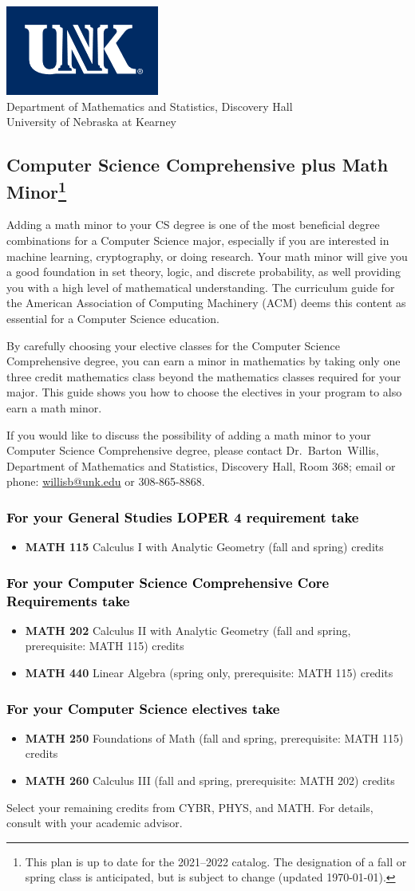\documentclass[10pt]{article}
\makeatletter
\newenvironment{mypar}[2]
   {\begin{list}{}%
     {\setlength\leftmargin{#1}
     \setlength\rightmargin{#2}}
     \item[]}
   {\end{list}}
\newcommand{\calcone}{\textbf{MATH 115} Calculus I with Analytic Geometry (fall and spring) \dotfill 5 credits}
\newcommand{\calctwo}{\textbf{MATH 202} Calculus II with Analytic Geometry (fall and spring, prerequisite: MATH 115) \dotfill 5 credits }
\newcommand{\foundations}{\textbf{MATH 250} Foundations of Math (fall and spring, prerequisite: MATH 115)  \dotfill 3 credits}
\newcommand{\calcthree}{\textbf{MATH 260} Calculus III  (fall and spring, prerequisite: MATH 202) \dotfill 5 credits}
\newcommand{\linear}{\textbf{MATH 440} Linear Algebra (spring only, prerequisite: MATH 115) \dotfill 3 credits}
\newcommand{\contactbw}{\mbox{Dr.\ Barton Willis}, Department of Mathematics and Statistics,  Discovery Hall, Room 368;
email or phone: \href{mailto:willisb@unk.edu}{willisb@unk.edu} or 308-865-8868.}
\newcommand{\forinfo}[2]{If you would like to discuss the possibility of adding a math {#1} to your {#2}, please contact \contactbw}
\newcommand{\catalog}{2021--2022 }
\newcommand{\myfootnote}{\footnote{This plan is up to date for  the \catalog catalog. The designation of a fall or spring class is 
anticipated, but  is subject to change (updated  \today).}}
\newcommand{\myheading}{
\begin{flushleft}
\includegraphics[scale=0.35]{unk-logo}\\
\setcounter{footnote}{0}
\vspace{0.25in}
 \textcolor{unkblue}{Department of Mathematics and Statistics, Discovery Hall} \\
  \textcolor{unkblue}{University of Nebraska at Kearney}
\end{flushleft}}
\makeatother
\begin{document}
\myheading


\subsection*{\textbf{\textcolor{unkblue}{Computer Science Comprehensive plus Math Minor\myfootnote}}}


Adding a math minor to your CS degree is one of the most beneficial degree combinations for a Computer Science major, especially if you are interested in machine learning, cryptography,  or doing research.  Your math minor will give you a good foundation in set theory, logic, and discrete probability, as well providing you with a high level of mathematical understanding. The curriculum guide for the American Association of Computing Machinery (ACM) deems  this
content  as essential for  a Computer Science education.

 By carefully choosing your elective classes for the Computer Science Comprehensive degree, you can earn a minor in mathematics by taking only one three credit mathematics class beyond the mathematics classes required for your major.  This guide shows you how to choose the electives in your program to also earn a math minor.

\forinfo{minor}{Computer Science Comprehensive degree}

\vspace{-0.1in}

\subsubsection*{\textcolor{black}{For  your General Studies LOPER 4 requirement take}}
\begin{itemize}
\item  \calcone
\end{itemize}

\vspace{-0.1in}
\subsubsection*{\textcolor{black}{For your Computer Science Comprehensive Core Requirements take}}
\begin{itemize}
\item \calctwo
\item \linear
\end{itemize}

\vspace{-0.1in}
\subsubsection*{\textcolor{black}{For your Computer Science electives take}}
\begin{itemize}
\item \foundations
\item \calcthree
\end{itemize}
\vspace{-0.1in}
\begin{mypar}{0.5cm}{0.5cm} Select your remaining credits from CYBR, PHYS,  and MATH. For details, consult with your 
   academic advisor.
\end{mypar}
\vspace{-0.2in}
\end{document}
